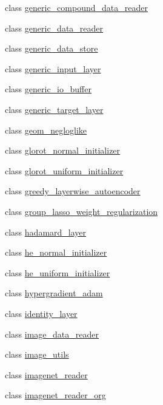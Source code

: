 \begin{DoxyCompactItemize}
class \hyperlink{classlbann_1_1generic__compound__data__reader}{generic\+\_\+compound\+\_\+data\+\_\+reader}
\item 
class \hyperlink{classlbann_1_1generic__data__reader}{generic\+\_\+data\+\_\+reader}
\item 
class \hyperlink{classlbann_1_1generic__data__store}{generic\+\_\+data\+\_\+store}
\item 
class \hyperlink{classlbann_1_1generic__input__layer}{generic\+\_\+input\+\_\+layer}
\item 
class \hyperlink{classlbann_1_1generic__io__buffer}{generic\+\_\+io\+\_\+buffer}
\item 
class \hyperlink{classlbann_1_1generic__target__layer}{generic\+\_\+target\+\_\+layer}
\item 
class \hyperlink{classlbann_1_1geom__negloglike}{geom\+\_\+negloglike}
\item 
class \hyperlink{classlbann_1_1glorot__normal__initializer}{glorot\+\_\+normal\+\_\+initializer}
\item 
class \hyperlink{classlbann_1_1glorot__uniform__initializer}{glorot\+\_\+uniform\+\_\+initializer}
\item 
class \hyperlink{classlbann_1_1greedy__layerwise__autoencoder}{greedy\+\_\+layerwise\+\_\+autoencoder}
\item 
class \hyperlink{classlbann_1_1group__lasso__weight__regularization}{group\+\_\+lasso\+\_\+weight\+\_\+regularization}
\item 
class \hyperlink{classlbann_1_1hadamard__layer}{hadamard\+\_\+layer}
\item 
class \hyperlink{classlbann_1_1he__normal__initializer}{he\+\_\+normal\+\_\+initializer}
\item 
class \hyperlink{classlbann_1_1he__uniform__initializer}{he\+\_\+uniform\+\_\+initializer}
\item 
class \hyperlink{classlbann_1_1hypergradient__adam}{hypergradient\+\_\+adam}
\item 
class \hyperlink{classlbann_1_1identity__layer}{identity\+\_\+layer}
\item 
class \hyperlink{classlbann_1_1image__data__reader}{image\+\_\+data\+\_\+reader}
\item 
class \hyperlink{classlbann_1_1image__utils}{image\+\_\+utils}
\item 
class \hyperlink{classlbann_1_1imagenet__reader}{imagenet\+\_\+reader}
\item 
class \hyperlink{classlbann_1_1imagenet__reader__org}{imagenet\+\_\+reader\+\_\+org}

\end{DoxyCompactItemize}
